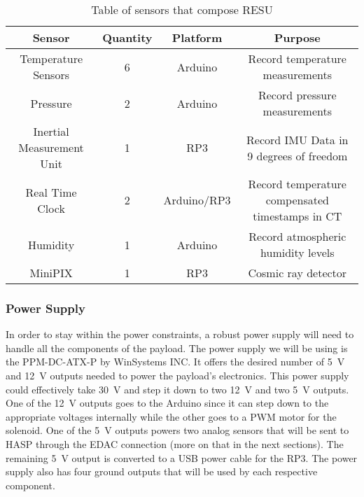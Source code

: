 \begin{table}[h!]
\centering
\caption{Table of sensors that compose RESU}
\label{tab:Sensors}
\bigskip
\begin{tabular}{|c|c|c|c|}
\hline
\multicolumn{1}{|c|}{\bfseries Sensor} & {\bfseries Quantity} & {\bfseries Platform} & {\bfseries Purpose} \\
\hline
    Temperature Sensors         	& 6 & Arduino  		& Record temperature measurements  \\ \hline
    Pressure        				& 2 & Arduino 		& Record pressure measurements \\ \hline
    Inertial Measurement Unit       & 1 & RP3    		& Record IMU Data in 9 degrees of freedom \\ \hline    
    Real Time Clock 				& 2 & Arduino/RP3 	& Record temperature compensated timestamps in CT \\\hline
    Humidity        				& 1 & Arduino 		& Record atmospheric humidity levels \\ \hline
    MiniPIX         				& 1 & RP3     		& Cosmic ray detector \\ \hline
\end{tabular}
\end{table}

\subsubsection{Power Supply}

In order to stay within the power constraints, a robust power supply will need to  handle all the components of the payload.  The power supply we will be using is the PPM-DC-ATX-P by WinSystems INC.  It offers the desired number of \SI{+5}{\volt} and \SI{+12}{\volt} outputs needed to power the payload's electronics.  This power supply could effectively take \SI{+30}{\volt} and step it down to two \SI{+12}{\volt} and two \SI{+5 }{\volt} outputs.  One of the \SI{+12}{\volt} outputs goes to the Arduino since it can step down to the appropriate voltages internally while the other goes to a PWM motor for the solenoid.  One of the \SI{+5 }{\volt} outputs powers two analog sensors that will be sent to HASP through the EDAC connection (more on that in the next sections).  The remaining \SI{+5 }{\volt} output is converted to a USB power cable for the RP3.  The power supply also has four ground outputs that will be used by each respective component. 


